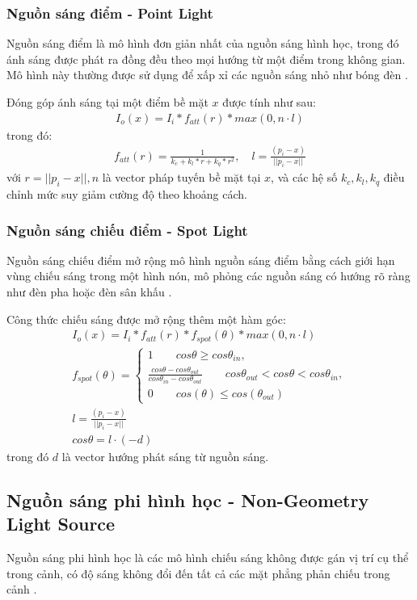 \subsubsection{Nguồn sáng điểm - Point Light}
Nguồn sáng điểm là mô hình đơn giản nhất của nguồn sáng hình học, trong đó ánh sáng được phát ra đồng đều theo mọi hướng từ một điểm trong không gian. Mô hình này thường được sử dụng để xấp xỉ các nguồn sáng nhỏ như bóng đèn \cite{principles_1990}.

Đóng góp ánh sáng tại một điểm bề mặt $x$ được tính như sau:
\begin{gather*}
	I_o(x) = I_i * f_{att}(r) * max(0, n \cdot l)
\end{gather*}
trong đó:
\begin{gather*}
	f_{att}(r) = \frac{1}{k_c + k_l * r + k_q * r^2}, \quad
	l = \frac{(p_i - x)}{||p_i - x||}
\end{gather*}
với $r = ||p_i - x||, n$ là vector pháp tuyến bề mặt tại $x$, và các hệ số $k_c, k_l, k_q$ điều chỉnh mức suy giảm cường độ theo khoảng cách.

\subsubsection{Nguồn sáng chiếu điểm - Spot Light}
Nguồn sáng chiếu điểm mở rộng mô hình nguồn sáng điểm bằng cách giới hạn vùng chiếu sáng trong một hình nón, mô phỏng các nguồn sáng có hướng rõ ràng như đèn pha hoặc đèn sân khấu \cite{principles_1990}.

Công thức chiếu sáng được mở rộng thêm một hàm góc:
\begin{gather*}
	I_o(x) = I_i * f_{att}(r) * f_{spot}(\theta) * max(0, n \cdot l)\\
	f_{spot}(\theta) =
	\begin{cases}
		1 \qquad cos\theta \ge cos\theta_{in},\\
		\frac{cos \theta - cos \theta_{out}}{cos \theta_{in} - cos \theta_{out}} \qquad cos \theta_{out} < cos \theta < cos \theta_{in},\\
		0 \qquad cos(\theta) \le cos(\theta_{out})
	\end{cases}\\
	l = \frac{(p_i - x)}{||p_i - x||}\\
	cos \theta = l \cdot (-d)
\end{gather*}
trong đó $d$ là vector hướng phát sáng từ nguồn sáng.

\subsection{Nguồn sáng phi hình học - Non-Geometry Light Source}
Nguồn sáng phi hình học là các mô hình chiếu sáng không được gán vị trí cụ thể trong cảnh, có độ sáng không đổi đến tất cả các mặt phẳng phản chiếu trong cảnh \cite{principles_1990}.

